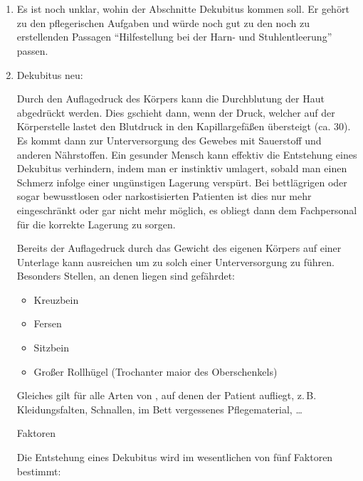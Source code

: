 \documentclass[
ngerman,
paper=a4,
asymmetric,
fontsize=10pt,
headings=small,
draft=false,
numbers=noenddot,
bibtotocnumbered,
footnotes=multiple,
toc=flat,
]{scrreprt}
\newcommand{\Neu}{\fontfamily{lmtt}\fontseries{lc}\selectfont\color{DarkGreen}}
\begin{document}
\section{\CO{[SAN]}}
  \begin{enumerate}
    \item Es ist noch unklar, wohin der Abschnitte Dekubitus
    kommen soll. Er gehört zu den pflegerischen Aufgaben und
    würde noch gut zu den noch zu erstellenden Passagen
    \enquote{Hilfestellung bei der Harn- und
    Stuhlentleerung} passen.
    \item Dekubitus neu:
    
    {\Neu {}

\Text
{\TxBeschreibung}
{Durch den Auflagedruck des Körpers kann die 
Durchblutung der Haut abgedrückt werden. Dies gschieht dann,
wenn der Druck, welcher auf der Körperstelle lastet den
Blutdruck in den Kapillargefäßen übersteigt (ca. 30\MmHg*).
Es kommt dann zur Unterversorgung des Gewebes mit Sauerstoff
und anderen Nährstoffen. Ein gesunder Mensch kann effektiv die Entstehung eines Dekubitus verhindern, indem man er instinktiv umlagert, sobald man einen Schmerz
infolge einer ungünstigen Lagerung verspürt. Bei
bettlägrigen oder sogar bewusstlosen oder narkostisierten
Patienten ist dies nur mehr eingeschränkt oder gar nicht
mehr möglich, es obliegt dann dem Fachpersonal für die
korrekte Lagerung zu sorgen.

Bereits der Auflagedruck durch das
Gewicht des eigenen Körpers auf einer Unterlage kann
ausreichen um zu solch einer
Unterversorgung zu führen. Besonders Stellen, an denen
 liegen sind gefährdet:
\begin{itemize}
  \item Kreuzbein
  \item Fersen
  \item Sitzbein
  \item Großer Rollhügel (Trochanter maior des
  Oberschenkels)
\end{itemize}
Gleiches gilt für alle Arten
von , auf denen der Patient aufliegt,
z.\,B.
Kleidungsfalten, Schnallen, im Bett vergessenes
Pflegematerial, \ldots 

}
{}
{}
{}
{}
    
    \TextSlide
{Faktoren}
{Die Entstehung eines Dekubitus wird im wesentlichen von fünf
Faktoren bestimmt:


}}
\end{enumerate}
\end{document}
